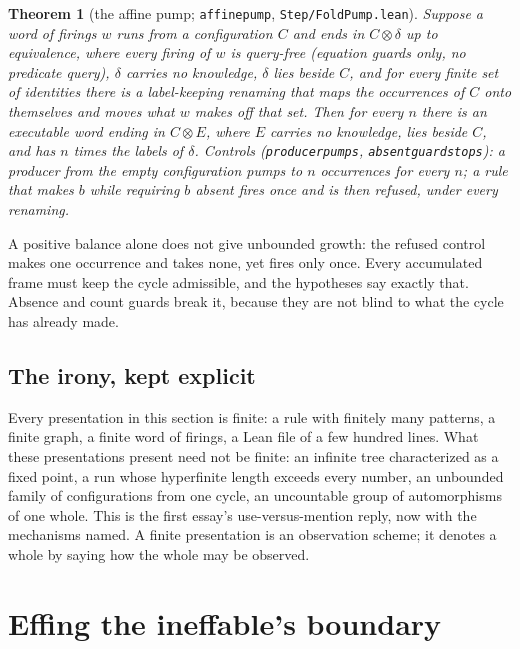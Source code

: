 \documentclass[]{article}
\newtheorem{theorem}{Theorem}
\theoremstyle{definition}
\theoremstyle{remark}
\newcommand{\codeus}{\textunderscore\allowbreak}
\newcommand{\code}[1]{\texttt{\let\_\codeus #1}}
\newcommand{\lpath}[1]{{\ttfamily\nolinkurl{#1}}}
\newcommand{\step}[1]{\lpath{Step/#1.lean}}
\begin{document}
\begin{theorem}[the affine pump; \code{affine\_pump}, \step{FoldPump}]
\label{thm:pump}
Suppose a word of firings $w$ runs from a configuration $C$ and ends in $C\otimes\delta$ up to
equivalence, where every firing of $w$ is query-free (equation guards only, no predicate query),
$\delta$ carries no knowledge, $\delta$ lies beside $C$, and for every finite set of identities there
is a label-keeping renaming that maps the occurrences of $C$ onto themselves and moves what $w$ makes
off that set. Then for every $n$ there
is an executable word ending in $C\otimes E$, where $E$ carries no knowledge, lies beside $C$, and has
$n$ times the labels of $\delta$. \emph{Controls} (\code{producer\_pumps}, \code{absent\_guard\_stops}): a
producer from the empty configuration pumps to $n$ occurrences for every $n$; a rule that makes $b$
while requiring $b$ absent fires once and is then refused, under every renaming.
\end{theorem}

A positive balance alone does not give unbounded growth: the refused control makes one occurrence and
takes none, yet fires only once. Every accumulated frame must keep the cycle admissible, and the
hypotheses say exactly that. Absence and count guards break it, because they are
not blind to what the cycle has already made.

\subsection{The irony, kept explicit}
\label{sec:irony}

Every presentation in this section is finite: a rule with finitely many patterns, a finite graph, a
finite word of firings, a Lean file of a few hundred lines. What these presentations present need not
be finite: an infinite tree characterized as a fixed point, a run whose hyperfinite length exceeds
every number, an unbounded family of configurations from one cycle, an uncountable group of
automorphisms of one whole. This is the first essay's use-versus-mention reply, now with the
mechanisms named. A finite presentation is an observation scheme; it denotes a whole by saying how
the whole may be observed.

\section{Effing the ineffable's boundary}
\label{sec:boundary}
\end{document}
